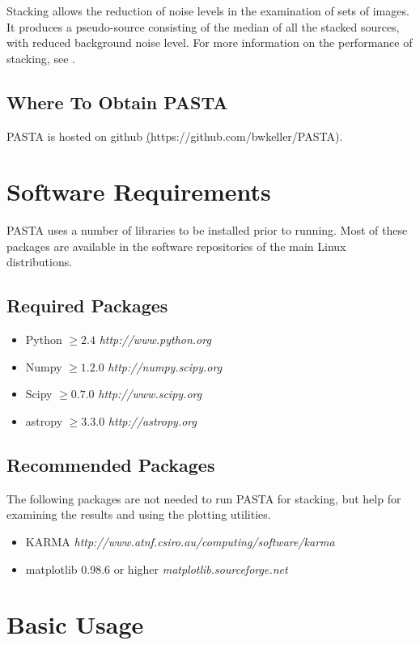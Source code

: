 \documentclass{article}
\begin{document}
Stacking allows the reduction of noise levels in the examination of sets of 
images.  It produces a pseudo-source consisting of the median of all the stacked
sources, with reduced background noise level.  For more information on the 
performance of stacking, see \cite[Stil et al. 2014]{stil2014}.

\subsection{Where To Obtain PASTA}
PASTA is hosted on github
\hyperref[https://github.com/bwkeller/PASTA](https://github.com/bwkeller/PASTA).

\section{Software Requirements}
PASTA uses a number of libraries to be installed prior to running.  Most of these
packages are available in the software repositories of the main Linux 
distributions.

\subsection{Required Packages}
\begin{itemize}
	\item Python $\ge 2.4$ \emph{http://www.python.org}
	\item Numpy $\ge 1.2.0$ \emph{http://numpy.scipy.org}
	\item Scipy $\ge 0.7.0$ \emph{http://www.scipy.org}
	\item astropy $\ge 3.3.0$ \emph{http://astropy.org}
\end{itemize}

\subsection{Recommended Packages}
The following packages are not needed to run PASTA for stacking, but help for
examining the results and using the plotting utilities.
\begin{itemize}
	\item KARMA \emph{http://www.atnf.csiro.au/computing/software/karma}
	\item matplotlib 0.98.6 or higher \emph{matplotlib.sourceforge.net}
\end{itemize}

\section{Basic Usage}
\end{document}
